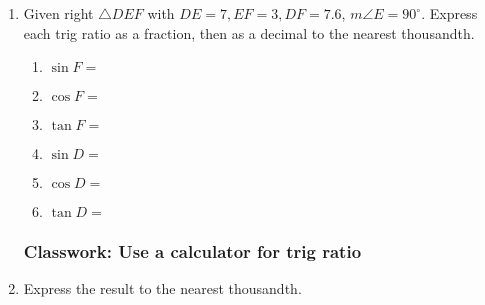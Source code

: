 \documentclass[12pt, oneside]{article}
\begin{document}
\begin{enumerate}
    \item Given right $\triangle DEF$ with $DE=7, EF=3, DF=7.6$, $m\angle E=90^\circ$. Express each trig ratio as a fraction, then as a decimal to the nearest thousandth.
      \begin{center}
         \vspace{1cm}
      \end{center}
      \begin{multicols}{2}
        \begin{enumerate}
          \item $\sin F = $ \vspace{1cm}
          \item $\cos F =$ \vspace{1cm}
          \item $\tan F =$
          \item $\sin D = $ \vspace{1cm}
          \item $\cos D =$ \vspace{1cm}
          \item $\tan D =$

        \end{enumerate}
      \end{multicols}

      \newpage
  \subsubsection*{Classwork: Use a calculator for trig ratio}
    \item Express the result to the nearest thousandth.  \vspace{1cm}


\end{enumerate}
\end{document}
